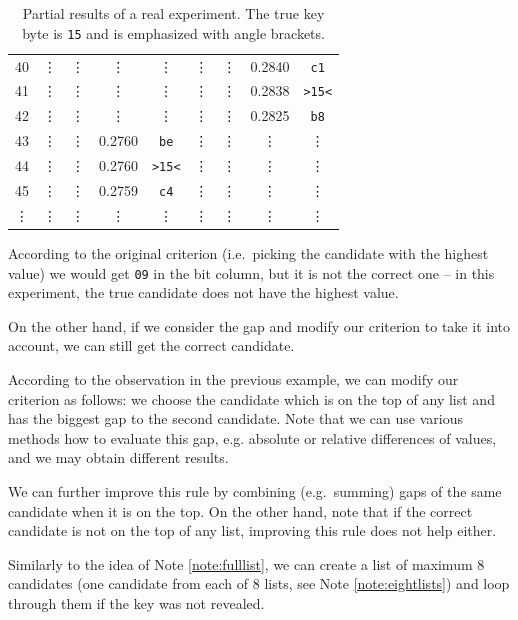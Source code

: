 \begin{example}
\begin{table}[H]
\begin{center}
\begin{tabular}{| c | c | c | c | c | c | c | c | c |}
					40     & \vdots & \vdots     & \vdots & \vdots     & \vdots & \vdots     & 0.2840 & {\tt c1}   \\
					41     & \vdots & \vdots     & \vdots & \vdots     & \vdots & \vdots     & 0.2838 & {\tt >15<} \\
					42     & \vdots & \vdots     & \vdots & \vdots     & \vdots & \vdots     & 0.2825 & {\tt b8}   \\
					43     & \vdots & \vdots     & 0.2760 & {\tt be}   & \vdots & \vdots     & \vdots & \vdots     \\
					44     & \vdots & \vdots     & 0.2760 & {\tt >15<} & \vdots & \vdots     & \vdots & \vdots     \\
					45     & \vdots & \vdots     & 0.2759 & {\tt c4}   & \vdots & \vdots     & \vdots & \vdots     \\
					\vdots & \vdots & \vdots     & \vdots & \vdots     & \vdots & \vdots     & \vdots & \vdots     \\
				\hline
			\end{tabular}
			\end{center}
		\caption{Partial results of a real experiment. The true key byte is {\tt 15} and is emphasized with angle brackets.}
		\label{tab:gap}
		\end{table}
		According to the original criterion (i.e.\ picking the candidate with the highest value) we would get {\tt 09} in the  bit column, but it is not the correct one -- in this experiment, the true candidate does not have the highest value.
		
		On the other hand, if we consider the gap and modify our criterion to take it into account, we can still get the correct candidate.
	\end{example}
	
	\begin{remark}
	\label{rem:gap}
		According to the observation in the previous example, we can modify our criterion as follows: we choose the candidate which is on the top of any list and has the biggest gap to the second candidate. Note that we can use various methods how to evaluate this gap, e.g. absolute or relative differences of values, and we may obtain different results.
		
		We can further improve this rule by combining (e.g.\ summing) gaps of the same candidate when it is on the top. On the other hand, note that if the correct candidate is not on the top of any list, improving this rule does not help either.
		
		Similarly to the idea of Note \ref{note:fulllist}, we can create a list of maximum $8$ candidates (one candidate from each of $8$ lists, see Note \ref{note:eightlists}) and loop through them if the key was not revealed.
	\end{remark}
	

